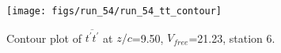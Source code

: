 \begin{figure}[H]
\centering
\texttt{[image: figs/run\_54/run\_54\_tt\_contour]}
\caption{Contour plot of $\overline{t^\prime t^\prime}$ at $z/c$=9.50, $V_{free}$=21.23, station 6.}
\end{figure}


